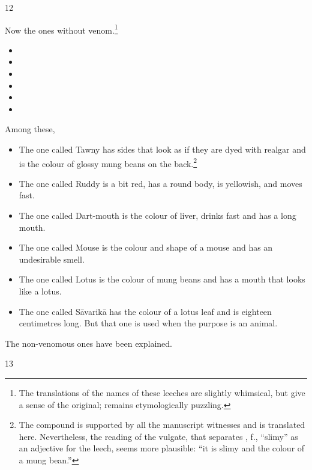 \begin{translation}
\item[12]

Now the ones without venom.\footnote{The translations of the names of these 
leeches are slightly whimsical, but give a sense of the original;  
remains etymologically puzzling.} 
\begin{itemize}
    \item {}
    \item {}
    \item {}
    \item {}
    \item {}
    \item {}
\end{itemize}
Among these,
\begin{itemize}
    \item The one called Tawny has sides that look as if they are dyed with
realgar and is the colour of glossy mung beans on the back.\footnote{The
    compound  is supported by all the manuscript
    witnesses and is translated here.  Nevertheless, the reading of the
    vulgate, that separates , f., “slimy” as an adjective for the
    leech, seems more plausible: “it is slimy and the colour of a mung
    bean.”}
    
    \item The one called Ruddy is a bit red, has a round body, is yellowish, and 
    moves fast.
    
    \item The one called Dart-mouth is the colour of liver, drinks fast and has a long 
    mouth.
    
    \item The one called Mouse is the colour and shape of a mouse and has an 
    undesirable smell.
    
    \item The one called Lotus is the colour of mung beans and has a mouth that looks 
    like a lotus.
    
    \item The one called Sāvarikā has the colour of a lotus leaf and is eighteen 
    centimetres long.  But that one is used when the purpose is an animal. 
\end{itemize}
The non-venomous ones have been explained.

\item [13]


\end{translation}
